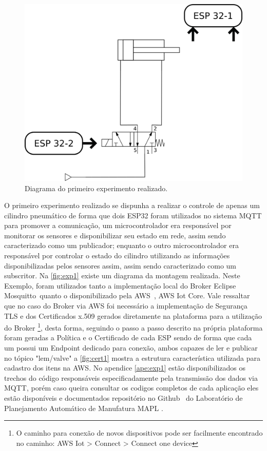 \begin{figure}[htb]
    \begin{center}
	    \includegraphics[scale=0.5]{figs/diag_exp1.png}
	\end{center}
	\caption{\label{fig:exp1} Diagrama do primeiro experimento realizado.} 
\end{figure}

O primeiro experimento realizado se dispunha a realizar o controle de apenas um cilindro pneumático de forma que dois
ESP32 foram utilizados no sistema \ac{MQTT} para promover a comunicação, um microcontrolador era responsável por monitorar 
os sensores e disponibilizar seu estado em rede, assim sendo caracterizado como um publicador; enquanto o outro 
microcontrolador era responsável por controlar o estado do cilindro utilizando as informações disponibilizadas pelos 
sensores assim, assim sendo caracterizado como um subscritor. Na \autoref{fig:exp1} existe um diagrama da montagem 
realizada. Neste Exemplo, foram utilizados tanto a implementação local do Broker Eclipse Mosquitto\textregistered~quanto 
o disponibilizado pela AWS\textregistered~, AWS Iot Core. Vale ressaltar que no caso do Broker via AWS foi necessário a 
implementação de Segurança \ac{TLS} e dos Certificados x.509 gerados diretamente na plataforma para a utilização do Broker
\footnote{O caminho para conexão de novos dispositivos pode ser facilmente encontrado no caminho: 
AWS Iot > Connect > Connect one device}, 
desta forma, seguindo o passo a passo descrito na própria plataforma foram geradas a Política e o Certificado de cada ESP
sendo de forma que cada um possui um Endpoint dedicado para conexão, ambos capazes de ler e publicar no tópico "lem/valve"
a \autoref{fig:cert1} mostra a estrutura característica utilizada para cadastro dos itens na AWS. No apendice \autoref{ape:exp1} 
estão disponibilizados os trechos do código responsáveis especificadamente pela transmissão dos dados via \ac{MQTT}, porém
caso queira consultar os codigos completos de cada aplicação eles estão disponíveis e documentados repositório no 
Github\textregistered~ do Laboratório de Planejamento Automático de Manufatura \ac{MAPL} \cite{mapl-repo}.

